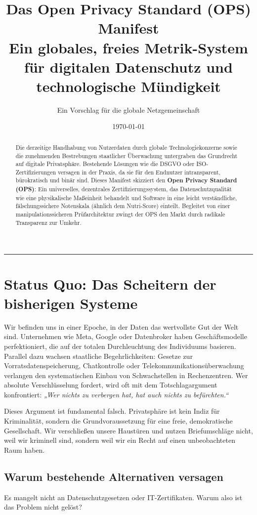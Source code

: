 \documentclass[11pt, a4paper]{article}
\title{\Huge \textbf{Das Open Privacy Standard (OPS) Manifest} \\ \vspace{0.5cm} \large Ein globales, freies Metrik-System für digitalen Datenschutz und technologische Mündigkeit}
\author{Ein Vorschlag für die globale Netzgemeinschaft}
\date{\today}
\begin{document}
	
	\maketitle
	
	\begin{abstract}
		\noindent Die derzeitige Handhabung von Nutzerdaten durch globale Technologiekonzerne sowie die zunehmenden Bestrebungen staatlicher Überwachung untergraben das Grundrecht auf digitale Privatsphäre. Bestehende Lösungen wie die DSGVO oder ISO-Zertifizierungen versagen in der Praxis, da sie für den Endnutzer intransparent, bürokratisch und binär sind. Dieses Manifest skizziert den \textbf{Open Privacy Standard (OPS)}: Ein universelles, dezentrales Zertifizierungssystem, das Datenschutzqualität wie eine physikalische Maßeinheit behandelt und Software in eine leicht verständliche, fälschungssichere Notenskala (ähnlich dem Nutri-Score) einteilt. Begleitet von einer manipulationssicheren Prüfarchitektur zwingt der OPS den Markt durch radikale Transparenz zur Umkehr.
	\end{abstract}
	
	\vspace{1cm}
	\hrule
	\vspace{1cm}
	
	\section{Status Quo: Das Scheitern der bisherigen Systeme}
	
	Wir befinden uns in einer Epoche, in der Daten das wertvollste Gut der Welt sind. Unternehmen wie Meta, Google oder Datenbroker haben Geschäftsmodelle perfektioniert, die auf der totalen Durchleuchtung des Individuums basieren. Parallel dazu wachsen staatliche Begehrlichkeiten: Gesetze zur Vorratsdatenspeicherung, Chatkontrolle oder Telekommunikationsüberwachung verlangen den systematischen Einbau von Schwachstellen in Rechenzentren. Wer absolute Verschlüsselung fordert, wird oft mit dem Totschlagargument konfrontiert: \textit{„Wer nichts zu verbergen hat, hat auch nichts zu befürchten.“} 
	
	Dieses Argument ist fundamental falsch. Privatsphäre ist kein Indiz für Kriminalität, sondern die Grundvoraussetzung für eine freie, demokratische Gesellschaft. Wir verschließen unsere Haustüren und nutzen Briefumschläge nicht, weil wir kriminell sind, sondern weil wir ein Recht auf einen unbeobachteten Raum haben.
	
	\subsection{Warum bestehende Alternativen versagen}
	Es mangelt nicht an Datenschutzgesetzen oder IT-Zertifikaten. Warum also ist das Problem nicht gelöst?
	
\end{document}
